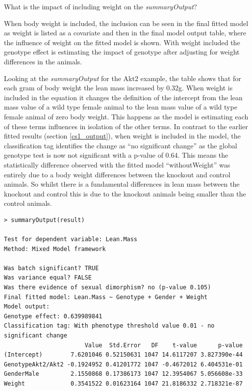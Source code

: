 \documentclass[12pt,a4paper]{article}
\begin{document}
What is the impact of including weight on the \textit{summaryOutput}?

When body weight is included, the inclusion can be seen in the final fitted model as weight is listed as a covariate and then in the final model output table, where the influence of weight on the fitted model is shown.  
With weight included the genotype effect is estimating the impact of genotype after adjusting for weight differences in the animals. 

Looking at the \textit{summaryOutput} for the Akt2 example, the table shows that for each gram of body weight the lean mass increased by 0.32g.  
When weight is included in the equation it changes the definition of the intercept from the lean mass value of a wild type female animal to the lean mass value of a wild type female animal of zero body weight. 
This happens as the model is estimating each of these terms influences in isolation of the other terms. 
In contrast to the earlier fitted results (section \ref{cs1_output}), when weight is included in the model, the classification tag identifies the change as “no significant change” 
as the global genotype test is now not significant with a p-value of 0.64.  
This means the statistically difference observed with the fitted model “withoutWeight” was entirely due to a body weight differences between the knockout and control animals.  
So whilst there is a fundamental differences in lean mass between the knockout and control this is due to the knockout animals being smaller than the control animals. 

\begingroup
    \fontsize{8pt}{12pt}\selectfont
\begin{verbatim}
> summaryOutput(result)

Test for dependent variable: Lean.Mass
Method: Mixed Model framework

Was batch significant? TRUE
Was variance equal? FALSE
Was there evidence of sexual dimorphism? no (p-value 0.105)
Final fitted model: Lean.Mass ~ Genotype + Gender + Weight
Model output:
Genotype effect: 0.639989841
Classification tag: With phenotype threshold value 0.01 - no significant change
                       Value  Std.Error   DF    t-value      p-value
(Intercept)        7.6201046 0.52150631 1047 14.6117207 3.827390e-44
GenotypeAkt2/Akt2 -0.1924952 0.41201772 1047 -0.4672012 6.404531e-01
GenderMale         2.1550868 0.17386173 1047 12.3954067 5.056608e-33
Weight             0.3541522 0.01623164 1047 21.8186332 2.718321e-87

\end{verbatim}
\endgroup
\end{document}
